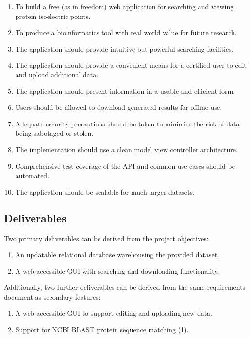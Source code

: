 \begin{enumerate}
\item To build a free (as in freedom) web application for searching and viewing
  protein isoelectric points.
\item To produce a bioinformatics tool with real world value for future
  research.
\item The application should provide intuitive but powerful searching
  facilities.
\item The application should provide a convenient means for a certified user to
  edit and upload additional data.
\item The application should present information in a usable and efficient form.
\item Users should be allowed to download generated results for offline use.
\item Adequate security precautions should be taken to minimise the risk of data
  being sabotaged or stolen.
\item The implementation should use a clean model view controller architecture.
\item Comprehensive test coverage of the API and common use cases should be
  automated.
\item The application should be scalable for much larger datasets.
\end{enumerate}

\subsection{Deliverables}
Two primary deliverables can be derived from the project objectives:

\begin{enumerate}
\item An updatable relational database warehousing the provided dataset.
\item A web-accessible GUI with searching and downloading functionality.
\end{enumerate}

Additionally, two further deliverables can be derived from the same requirements
document as secondary features:

\begin{enumerate}
\item A web-accessible GUI to support editing and uploading new data.
\item Support for NCBI BLAST protein sequence matching (1).
\end{enumerate}

